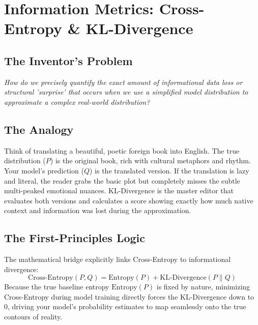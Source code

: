 \documentclass[12pt,a4paper]{article}
\begin{document}
\section{Information Metrics: Cross-Entropy \& KL-Divergence}
\subsection*{The Inventor's Problem}
\textit{How do we precisely quantify the exact amount of informational data loss or structural 'surprise' that occurs when we use a simplified model distribution to approximate a complex real-world distribution?}

\subsection*{The Analogy}
Think of translating a beautiful, poetic foreign book into English. The true distribution ($P$) is the original book, rich with cultural metaphors and rhythm. Your model's prediction ($Q$) is the translated version. If the translation is lazy and literal, the reader grabs the basic plot but completely misses the subtle multi-peaked emotional nuances. KL-Divergence is the master editor that evaluates both versions and calculates a score showing exactly how much native context and information was lost during the approximation.

\subsection*{The First-Principles Logic}
The mathematical bridge explicitly links Cross-Entropy to informational divergence:
$$\text{Cross-Entropy}(P, Q) = \text{Entropy}(P) + \text{KL-Divergence}(P \| Q)$$
Because the true baseline entropy $\text{Entropy}(P)$ is fixed by nature, minimizing Cross-Entropy during model training directly forces the KL-Divergence down to 0, driving your model's probability estimates to map seamlessly onto the true contours of reality.
\end{document}

